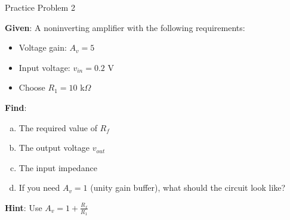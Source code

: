 \documentclass[10pt, aspectratio=169]{beamer}
\newif\ifshowsolutions
\begin{document}
\begin{frame}{Practice Problem 2}
    
    \textbf{Given}: A noninverting amplifier with the following requirements:
    \begin{itemize}
        \item Voltage gain:  $A_v = 5$
        \item Input voltage: $v_{in} = 0.2$ V
        \item Choose $R_1 = 10$ k$\Omega$
    \end{itemize}
    
    \vspace{0.3cm}
    
    \textbf{Find}: 
    \begin{enumerate}[(a)]
        \item The required value of $R_f$
        \item The output voltage $v_{out}$
        \item The input impedance
        \item If you need $A_v = 1$ (unity gain buffer), what should the circuit look like?
    \end{enumerate}
    
    \vspace{0.5cm}
    
    \textbf{Hint}: Use $A_v = 1 + \frac{R_f}{R_1}$
    
\end{frame}

\ifshowsolutions
\begin{frame}{Practice Problem 2 Solution}
    
    \textbf{Given}: $A_v = 5$, $R_1 = 10$ k$\Omega$, $v_{in} = 0.2$ V
    
    \vspace{0.3cm}
    
    \textbf{Solutions}:
    
    (a) Required $R_f$:
    \[
    5 = 1 + \frac{R_f}{10\text{ k}\Omega}
    \]
    \[
    \frac{R_f}{10\text{ k}\Omega} = 4 \Rightarrow R_f = \boxed{40 \text{ k}\Omega}
    \]
    
    (b) Output voltage:
    \[
    v_{out} = A_v \cdot v_{in} = 5 \times 0.2\text{ V} = \boxed{1.0 \text{ V}}
    \]
    
    (c) Input impedance:
    \[
    R_{in} = \boxed{\infty} \text{ (ideally)}
    \]
    
    (d) For unity gain buffer ($A_v = 1$):
    \begin{itemize}
        \item Connect output directly to inverting input (direct feedback)
        \item Remove $R_1$ and $R_f$
        \item Input to noninverting terminal
    \end{itemize}
    
\end{frame}
\fi
\end{document}
